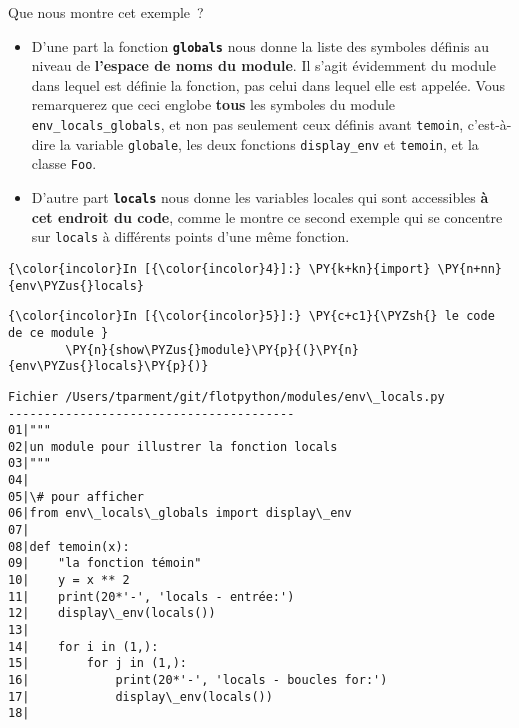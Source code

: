     Que nous montre cet exemple~?

\begin{itemize}
\item
  D'une part la fonction \textbf{\texttt{globals}} nous donne la liste
  des symboles définis au niveau de \textbf{l'espace de noms du module}.
  Il s'agit évidemment du module dans lequel est définie la fonction,
  pas celui dans lequel elle est appelée. Vous remarquerez que ceci
  englobe \textbf{tous} les symboles du module
  \texttt{env\_locals\_globals}, et non pas seulement ceux définis avant
  \texttt{temoin}, c'est-à-dire la variable \texttt{globale}, les deux
  fonctions \texttt{display\_env} et \texttt{temoin}, et la classe
  \texttt{Foo}.
\item
  D'autre part \textbf{\texttt{locals}} nous donne les variables locales
  qui sont accessibles \textbf{à cet endroit du code}, comme le montre
  ce second exemple qui se concentre sur \texttt{locals} à différents
  points d'une même fonction.
\end{itemize}

    \begin{Verbatim}[commandchars=\\\{\},frame=single,framerule=0.3mm,rulecolor=\color{cellframecolor}]
{\color{incolor}In [{\color{incolor}4}]:} \PY{k+kn}{import} \PY{n+nn}{env\PYZus{}locals}
\end{Verbatim}


    \begin{Verbatim}[commandchars=\\\{\},frame=single,framerule=0.3mm,rulecolor=\color{cellframecolor}]
{\color{incolor}In [{\color{incolor}5}]:} \PY{c+c1}{\PYZsh{} le code de ce module }
        \PY{n}{show\PYZus{}module}\PY{p}{(}\PY{n}{env\PYZus{}locals}\PY{p}{)}
\end{Verbatim}


    \begin{Verbatim}[commandchars=\\\{\},frame=single,framerule=0.3mm,rulecolor=\color{cellframecolor}]
Fichier /Users/tparment/git/flotpython/modules/env\_locals.py
----------------------------------------
01|"""
02|un module pour illustrer la fonction locals
03|"""
04|
05|\# pour afficher
06|from env\_locals\_globals import display\_env
07|
08|def temoin(x):
09|    "la fonction témoin"
10|    y = x ** 2
11|    print(20*'-', 'locals - entrée:')
12|    display\_env(locals())
13|
14|    for i in (1,):
15|        for j in (1,):
16|            print(20*'-', 'locals - boucles for:')
17|            display\_env(locals())
18|
\end{Verbatim}

